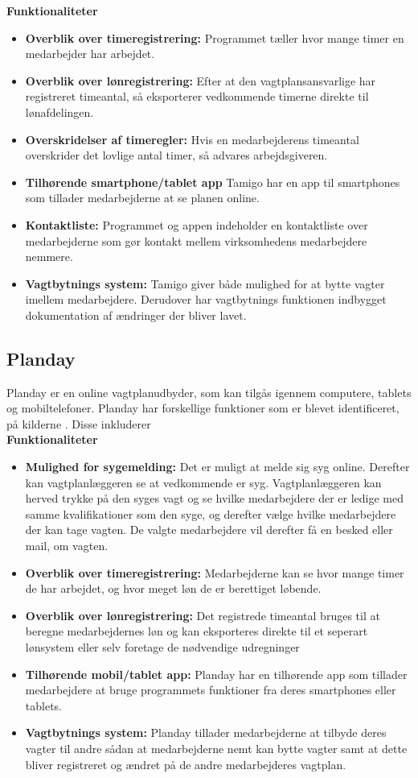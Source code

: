 \textbf{Funktionaliteter}
\begin{itemize}
\item {\textbf{Overblik over timeregistrering:} Programmet tæller hvor mange timer en medarbejder har arbejdet.}
\item {\textbf{Overblik over lønregistrering:} Efter at den vagtplansansvarlige har registreret timeantal, så eksporterer vedkommende timerne direkte til lønafdelingen.} 
\item {\textbf{Overskridelser af timeregler:} Hvis en medarbejderens timeantal overskrider det lovlige antal timer, så advares arbejdsgiveren.}
\item {\textbf{Tilhørende smartphone/tablet app} Tamigo har en app til smartphones som tillader medarbejderne at se planen online.}
\item {\textbf{Kontaktliste:} Programmet og appen indeholder en kontaktliste over medarbejderne som gør kontakt mellem virksomhedens medarbejdere nemmere.}
\item {\textbf{Vagtbytnings system:} Tamigo giver både mulighed for at bytte vagter imellem medarbejdere. Derudover har vagtbytnings funktionen indbygget dokumentation af ændringer der bliver lavet.}
\end{itemize}

\subsection{Planday}
Planday er en online vagtplanudbyder, som kan tilgås igennem computere, tablets og mobiltelefoner. Planday har forskellige funktioner som er blevet identificeret, på kilderne \citep{DanskInternetHandel, Simonsen2014, Planday, Play, Play}. Disse inkluderer\\

\noindent\textbf{Funktionaliteter}
\begin{itemize}
\item {\textbf{Mulighed for sygemelding:} Det er muligt at melde sig syg online. Derefter kan vagtplanlæggeren se at vedkommende er syg. Vagtplanlæggeren kan herved trykke på den syges vagt og se hvilke medarbejdere der er ledige med samme kvalifikationer som den syge, og derefter vælge hvilke medarbejdere der kan tage vagten. De valgte medarbejdere vil derefter få en besked eller mail, om vagten.}
\item {\textbf{Overblik over timeregistrering:} Medarbejderne kan se hvor mange timer de har arbejdet, og hvor meget løn de er berettiget løbende.}
\item{\textbf{Overblik over lønregistrering:} Det registrede timeantal bruges til at beregne medarbejdernes løn og kan eksporteres direkte til et seperart lønsystem eller selv foretage de nødvendige udregninger}
\item{\textbf{Tilhørende mobil/tablet app:} Planday har en tilhørende app som tillader medarbejdere at bruge programmets funktioner fra deres smartphones eller tablets.}
\item{\textbf{Vagtbytnings system:} Planday tillader medarbejderne at tilbyde deres vagter til andre sådan at medarbejderne nemt kan bytte vagter samt at dette bliver registreret og ændret på de andre medarbejderes vagtplan.}
\end{itemize} 

